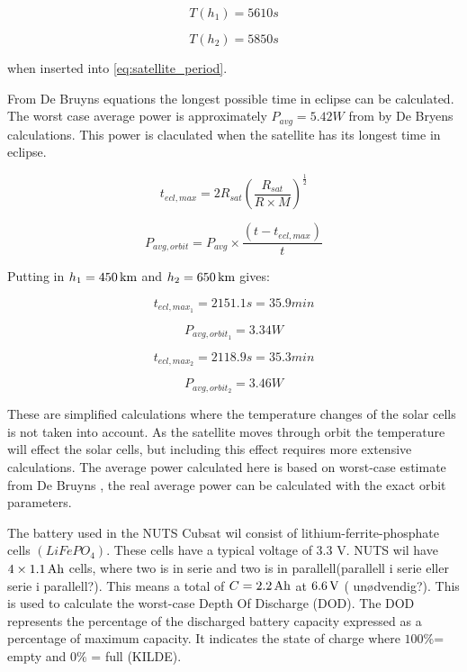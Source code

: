 \begin{equation}
T(h_1) = 5610s
\end{equation}

\begin{equation}
T(h_2) = 5850s
\end{equation}

when inserted into \autoref{eq:satellite_period}.

From De Bruyns equations \cite{Satellite Power Systems} the longest possible time in eclipse can be calculated. The worst case average power is approximately $P_{avg} = 5.42 W$ from by De Bryens calculations. This power is claculated when the satellite has its longest time in eclipse.

\begin{equation}
	t_{ecl,max} = 2R_{sat}\left(\frac{R_{sat}}{R\times M}\right)^{\frac{1}{2}}
	\label{Maximum time in eclipse}
\end{equation}

\begin{equation}
	P_{avg,orbit} = P_{avg}\times\frac{(t-t_{ecl,max})}{t}
	\label{Average effect during one orbit}
\end{equation}

Putting in $h_1 =\unit[450]{km}$ and $h_2 = \unit[650]{km}$ gives:

\begin{equation}
t_{ecl,max_1} = 2151.1 s = 35.9 min
\end{equation}

\begin{equation}
P_{avg,orbit_1} = 3.34W
\end{equation}

\begin{equation}
t_{ecl,max_2} = 2118.9 s = 35.3 min
\end{equation}

\begin{equation}
P_{avg,orbit_2} = 3.46W
\end{equation}

These are simplified calculations where the temperature changes of the solar cells is not taken into account. As the satellite moves through orbit the temperature will effect the solar cells, but including this effect requires more extensive calculations. The average power calculated here is based on worst-case estimate from De Bruyns \cite{Satellite Power Systems}, the real average power can be calculated with the exact orbit parameters. 

The battery used in the NUTS Cubsat wil consist of lithium-ferrite-phosphate cells $(LiFePO_4)$\cite{Overview of NUTS}. 
These cells have a typical voltage of 3.3 V. NUTS wil have $4\times \unit[1.1]{Ah}$ cells, where two is in serie and two is in parallell(parallell i serie eller serie i parallell?). This means a total of $C=\unit[2.2]{Ah}$ at $\unit[6.6]{V}$ (\cite{Satellite Power Systems} unødvendig?). This is used to calculate the worst-case Depth Of Discharge (DOD). The DOD represents the percentage of the discharged battery capacity expressed as a percentage of maximum capacity. It indicates the state of charge where $100\% $= empty and  $0\%$ = full (KILDE).

